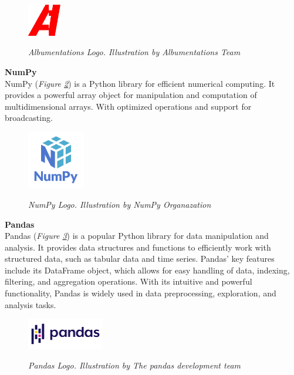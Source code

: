\begin{figure}[H]
\centering
\includegraphics[width=0.13\textwidth]{imatges/studies_and_decisions/albumentations-logo.png}
\caption[Albumentations Logo]{\textit{Albumentations Logo. Illustration by Albumentations Team}}
{\label{fig:albumentations-logo}}
\end{figure}


\vspace{0.5cm}
\textbf{NumPy} \\

NumPy (\textit{Figure \ref{fig:numpy-logo}}) is a Python library for efficient numerical computing. It provides a powerful array object for manipulation and computation of multidimensional arrays. With optimized operations and support for broadcasting.

\begin{figure}[H]
\centering
\includegraphics[width=0.225\textwidth]{imatges/studies_and_decisions/numpy-logo.png}
\caption[NumPy Logo]{\textit{NumPy Logo. Illustration by NumPy Organazation}}
{\label{fig:numpy-logo}}
\end{figure}


\vspace{0.5cm}
\textbf{Pandas} \\

Pandas (\textit{Figure \ref{fig:pandas-logo}}) is a popular Python library for data manipulation and analysis. It provides data structures and functions to efficiently work with structured data, such as tabular data and time series. Pandas' key features include its DataFrame object, which allows for easy handling of data, indexing, filtering, and aggregation operations. With its intuitive and powerful functionality, Pandas is widely used in data preprocessing, exploration, and analysis tasks.

\begin{figure}[H]
\centering
\includegraphics[width=0.3\textwidth]{imatges/studies_and_decisions/pandas-logo.png}
\caption[Pandas Logo]{\textit{Pandas Logo. Illustration by The pandas development team}}
{\label{fig:pandas-logo}}
\end{figure}


